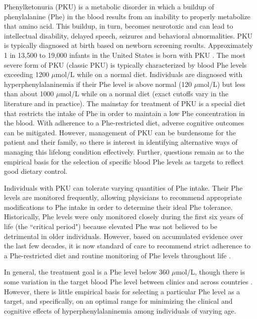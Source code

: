 \documentclass{svjour3}                     %
\begin{document}
Phenylketonuria (PKU) is a metabolic disorder in which a buildup of phenylalanine (Phe) in the blood results from an inability to properly metabolize that amino acid. This buildup, in turn, becomes neurotoxic and can lead to intellectual disability, delayed speech, seizures and behavioral abnormalities. PKU is typically diagnosed at birth based on newborn screening results. Approximately 1 in 13,500 to 19,000 infants in the United States is born with PKU \citep{Hegge:2009ep,NationalInstitutesofHealthConsensusDevelopmentPanel:2001ti}. The most severe form of PKU (classic PKU) is typically characterized by blood Phe levels exceeding 1200 $\mu$mol/L while on a normal diet. Individuals are diagnosed with hyperphenylalaninemia if their Phe level is above normal (120 $\mu$mol/L) but less than about 1000 $\mu$mol/L while on a normal diet (exact cutoffs vary in the literature and in practice). The mainstay for treatment of PKU is a special diet that restricts the intake of Phe in order to maintain a low Phe concentration in the blood.  With adherence to a Phe-restricted diet, adverse cognitive outcomes can be mitigated. However, management of PKU can be burdensome for the patient and their family, so there is interest in identifying alternative ways of managing this lifelong condition effectively. Further, questions remain as to the empirical basis for the selection of specific blood Phe levels as targets to reflect good dietary control.

Individuals with PKU can tolerate varying quantities of Phe intake. Their Phe levels are monitored frequently, allowing physicians to recommend appropriate modifications to Phe intake in order to determine their ideal Phe tolerance. Historically, Phe levels were only monitored closely during the first six years of life (the ``critical period") because elevated Phe was not believed to be detrimental in older individuals. However, based on accumulated evidence over the last few decades, it is now standard of care to recommend strict adherence to a Phe-restricted diet and routine monitoring of Phe levels throughout life \citep{NationalInstitutesofHealthConsensusDevelopmentPanel:2001ti, Koch:2002ul}.

In general, the treatment goal is a Phe level below 360 $\mu$mol/L, though there is some variation in the target blood Phe level between clinics and across countries \citep{NationalInstitutesofHealthConsensusDevelopmentPanel:2001ti, Giovannini:2007kg}. However, there is little empirical basis for selecting a particular Phe level as a target, and specifically, on an optimal range for minimizing the clinical and cognitive effects of hyperphenylalaninemia among individuals of varying age.
\end{document}
